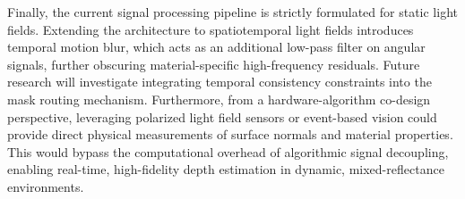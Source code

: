 \documentclass[lettersize,journal]{IEEEtran}
\begin{document}
Finally, the current signal processing pipeline is strictly formulated for static light fields. Extending the architecture to spatiotemporal light fields introduces temporal motion blur, which acts as an additional low-pass filter on angular signals, further obscuring material-specific high-frequency residuals. Future research will investigate integrating temporal consistency constraints into the mask routing mechanism. Furthermore, from a hardware-algorithm co-design perspective, leveraging polarized light field sensors or event-based vision could provide direct physical measurements of surface normals and material properties. This would bypass the computational overhead of algorithmic signal decoupling, enabling real-time, high-fidelity depth estimation in dynamic, mixed-reflectance environments.



\end{document}

